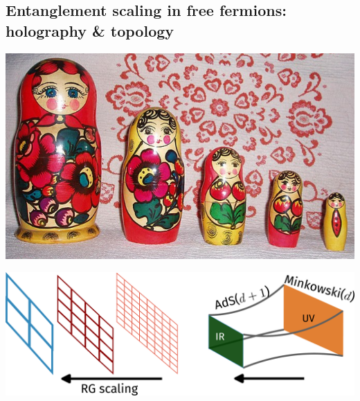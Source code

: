 \documentclass[9pt,aspectratio=169]{beamer}
\begin{document}
\begin{frame}{}
\section{Entanglement scaling in free fermions: holography \& topology}

\begin{minipage}{0.3\textwidth}
	\includegraphics[width=\textwidth]{figures/Matroshka.png}
\end{minipage}
\hspace*{\fill}
\begin{minipage}{0.5\textwidth}
\includegraphics[width=\textwidth]{figures/holography.pdf}
\end{minipage}

\end{frame}
\end{document}
